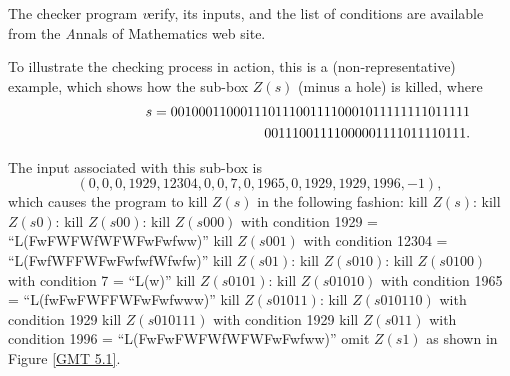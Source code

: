 The checker program {\textit verify}, its inputs, and the list of conditions
are available from the {\textit Annals of Mathematics} web site.
\begin{example} \label{GMT 5.4}
To illustrate the checking process in action, this is a (non-representative)
example, which shows how the sub-box $Z(s)$ (minus a hole) is killed,
where
\begin{eqnarray*}
&&s=0010001100011101110011110001011111111011111\\
&&\hskip2in 00111001111000001111011110111. 
\end{eqnarray*}

The input associated with this sub-box is
$$(0, 0, 0, 1929, 12304, 0, 0, 7, 0, 1965, 0, 1929, 1929, 1996, -1),$$
which causes the program to kill $Z(s)$ in the following fashion:
{\noindent\obeylines
\def\>{\hskip 0.05in}
 kill $Z(s)$:
\>kill $Z(s0)$:
\>\>kill $Z(s00)$:
\>\>\>kill $Z(s000)$ with condition 1929 = ``L(FwFWFWfWFWFwFwfww)''
\>\>\>kill $Z(s001)$ with condition 12304 = ``L(FwfWFFWFwFwfwfWfwfw)''
\>\>kill $Z(s01)$:
\>\>\>kill $Z(s010)$:
\>\>\>\>kill $Z(s0100)$ with condition 7 = ``L(w)''
\>\>\>\>kill $Z(s0101)$:
\>\>\>\>\>kill $Z(s01010)$ with condition 1965 = ``L(fwFwFWFFWFwFwfwww)''
\>\>\>\>\>kill $Z(s01011)$:
\>\>\>\>\>\>kill $Z(s010110)$ with condition 1929
\>\>\>\>\>\>kill $Z(s010111)$ with condition 1929
\>\>\>kill $Z(s011)$ with condition 1996 = ``L(FwFwFWFWfWFWFwFwfww)''
\>omit $Z(s1)$
\noindent as shown in Figure \ref{GMT 5.1}.
}


\end{example}
